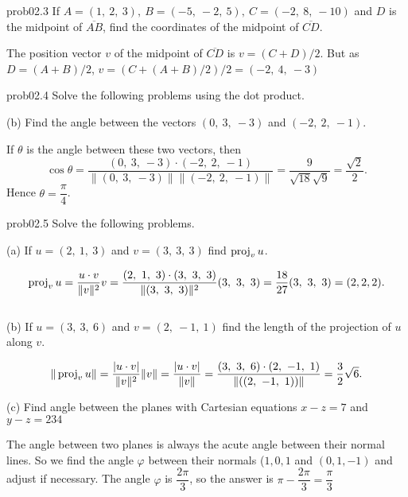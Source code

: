 

\begin{sol}{prob02.3} If $A=(1,\ 2,\ 3),\ B=(-5,\ -2,\ 5),\ C=(-2,\ 8,\ -10)$
and $D$ is the midpoint of $\overline{AB}$, find the coordinates of the
midpoint of $\overline{CD}$.

\soln The position vector $v$ of the midpoint of $\overline{CD}$ is $v=(C+D)/2$. But as $D=(A+B)/2$, 
$v=(C+(A+B)/2)/2=(-2,\ 4,\ -3)$

\end{sol} \begin{sol}{prob02.4} Solve the following problems using the dot product.\medskip





(b) Find the angle between the vectors $ (0,\ 3,\ -3)$
and $ (-2,\ 2,\ -1)$.  \medskip

\soln If $\theta$ is the angle between these two vectors, then $$\cos \theta=\dfrac{(0,\ 3,\ -3)\cdot(-2,\ 2,\ -1)}{\| (0,\ 3,\ -3)\| \| (-2,\ 2,\ -1)\|}=\dfrac{9}{\sqrt{18}\sqrt{9}}=\dfrac{\sqrt{2}}{2}.$$ Hence $\theta= \dfrac{\pi}{4}$.


\end{sol} \begin{sol}{prob02.5}  Solve the following problems. \medskip


(a) If $u=(2,\ 1,\ 3)$ and $v=(3,\ 3,\ 3)$ find
 $\operatorname{proj}_{v}{u}$. 

\soln  $$\proj_{v}{u}=\dfrac{u\cdot v}{\|v\|^2}v=\dfrac{(2,\ 1,\ 3)\cdot (3,\ 3,\ 3)}{\|(3,\ 3,\ 3)\|^2}(3,\ 3,\ 3)=\dfrac{18}{27}(3,\ 3,\ 3)=(2,2,2).$$ \medskip
\\


(b)  If $u=(3,\ 3,\ 6)$ and $v=(2,\ -1,\ 1)$ find
the length of the projection of $u$ along $v$. 

\soln
$$\|\proj_{v}{u}\|=\dfrac{|u\cdot v|}{\|v\|^2}\|v\|=\dfrac{|u\cdot v|}{\|v\|}=\dfrac{(3,\ 3,\ 6)\cdot (2,\ -1,\ 1)}{\|((2,\ -1,\ 1))\|}=\dfrac{ 3}{ 2}\sqrt{6}.$$
 
(c) Find angle between the planes with Cartesian equations $x-z=7$ and $y-z=234$
\medskip

\soln The angle between two planes is always the acute angle between their normal lines. So we find the angle $\varphi$ between their normals ($1,0,1$ and $(0,1,-1)$ and adjust if necessary. The angle $\varphi$ is $\dfrac{2\pi}{3}$, so the answer is $\pi -\dfrac{2\pi}{3}=\dfrac{\pi}{3}$

\medskip
 
  
\end{sol}